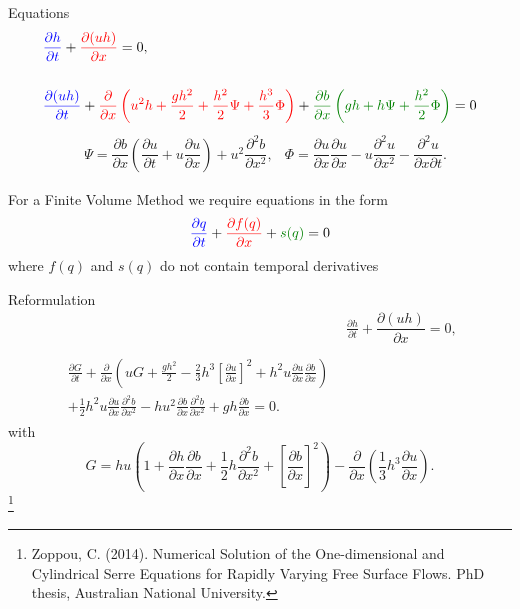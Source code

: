 \documentclass[]{beamer}
\newcommand\blfootnote[1]{%
	\begingroup
	\renewcommand\thefootnote{}\footnote{#1}%
	\addtocounter{footnote}{-1}%
	\endgroup
}
\begin{document}
\begin{frame}{Equations}
	\begin{subequations}
		\begin{align*}
		& {\color{blue}\frac{\partial h}{\partial t}} + {\color{red}\dfrac{\partial (uh)}{\partial x}} = 0,  \\ \\
		& {\color{blue}\dfrac{\partial (uh)}{\partial t}} +  {\color{red}\dfrac{\partial}{\partial x} \left ( u^2h + \dfrac{gh^2}{2} + \dfrac{h^2}{2}{\Psi } + \dfrac{h^3}{3}{ { \Phi } }  \right ) }  +  {\color{green!50!black}\dfrac{\partial b}{\partial x} \left (gh +   h {\Psi } + \dfrac{h^2}{2}{ {  \Phi } }  \right )} = 0
		\end{align*}
	\end{subequations}
	\begin{align*}
	&{ \Psi }  = \dfrac{\partial b}{\partial x}\left(\dfrac{\partial u}{\partial t} + u\dfrac{\partial u}{\partial x} \right)  + u^2\dfrac{\partial^2 b}{\partial x^2}, &
	{  \Phi }  = \dfrac{\partial u }{\partial x} \dfrac{\partial u}{\partial x} -u \dfrac{\partial^2 u}{\partial x^2}  - \dfrac{\partial^2 u}{\partial x \partial t} .
	\end{align*}
	
	For a Finite Volume Method we require equations in the form
	\begin{equation*}
	{\color{blue}\frac{\partial q}{\partial t}} +  {\color{red}\frac{\partial f(q)}{\partial x}} +  {\color{green!50!black} s(q) } = 0
	\end{equation*}
	where $f(q)$ and $s(q)$ do not contain temporal derivatives
\end{frame}

\begin{frame}{Reformulation}
	\begin{align*}
	& \frac{\partial h}{\partial t} + \dfrac{\partial (uh)}{\partial x} = 0,  \\ \nonumber \\
	\begin{split}
	\frac{\partial G}{\partial t}  + \frac{\partial}{\partial x} \left( {u} G + \frac{gh^2}{2} - \frac{2}{3}h^3 \left[\frac{\partial {u}}{\partial x}\right]^2 + h^2 {u}\frac{\partial {u}}{\partial x}\frac{\partial b}{\partial x} \right) \\ + \frac{1}{2}h^2 {u} \frac{\partial {u}}{\partial x} \frac{\partial^2 b}{\partial x^2}  - h {u}^2\frac{\partial b}{\partial x}\frac{\partial^2 b}{\partial x^2} + gh\frac{\partial b}{\partial x} = 0 .
	\end{split}
	\end{align*}
	with
	\[ G =  h {u} \left(1 + \frac{\partial h}{\partial x}\frac{\partial b}{\partial x} + \frac{1}{2}h\frac{\partial^2 b}{\partial x^2} + \left[\frac{\partial b}{\partial x}\right]^2 \right) - \frac{\partial}{\partial x}\left(\frac{1}{3}h^3  \frac{\partial {u}}{\partial x}\right).\]
	\blfootnote{Zoppou, C. (2014).
		Numerical Solution of the One-dimensional and Cylindrical
		Serre Equations for Rapidly Varying Free Surface Flows. PhD thesis, Australian National University.}
\end{frame}
\end{document}
